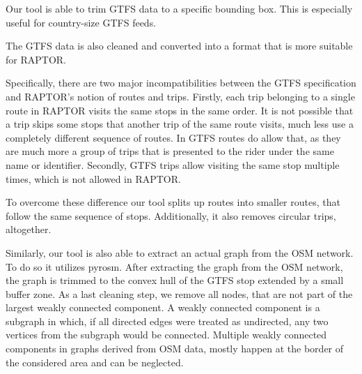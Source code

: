 Our tool is able to trim GTFS data to a specific bounding box.
This is especially useful for country-size GTFS feeds.

The GTFS data is also cleaned and converted into a format that is more suitable for RAPTOR.

Specifically, there are two major incompatibilities between the GTFS specification and RAPTOR's notion of routes and trips.
Firstly, each trip belonging to a single route in RAPTOR visits the same stops in the same order.
It is not possible that a trip skips some stops that another trip of the same route visits, much less use a completely different sequence of routes.
In GTFS routes do allow that, as they are much more a group of trips that is presented to the rider under the same name or identifier.
Secondly, GTFS trips allow visiting the same stop multiple times, which is not allowed in RAPTOR.

To overcome these difference our tool splits up routes into smaller routes, that follow the same sequence of stops.
Additionally, it also removes circular trips, altogether.

Similarly, our tool is also able to extract an actual graph from the OSM network.
To do so it utilizes pyrosm.
After extracting the graph from the OSM network, the graph is trimmed to the convex hull of the GTFS stop extended by a small buffer zone.
As a last cleaning step, we remove all nodes, that are not part of the largest weakly connected component.
A weakly connected component is a subgraph in which, if all directed edges were treated as undirected, any two vertices from the subgraph would be connected.
Multiple weakly connected components in graphs derived from OSM data, mostly happen at the border of the considered area and can be neglected.

